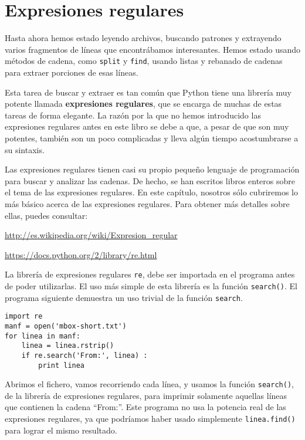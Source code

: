 
\chapter{Expresiones regulares}

Hasta ahora hemos estado leyendo archivos, buscando patrones y extrayendo varios
fragmentos de líneas que encontrábamos interesantes. Hemos estado usando métodos de cadena, como {\tt split}
y {\tt find}, usando listas y rebanado de cadenas para extraer porciones de esas líneas.

Esta tarea de buscar y extraer es tan común que Python tiene una librería muy potente
llamada {\bf expresiones regulares}, que se encarga de muchas de estas tareas de forma elegante. La
razón por la que no hemos introducido las expresiones regulares antes en este libro se debe a que,
a pesar de que son muy potentes, también son un poco complicadas y lleva algún tiempo acostumbrarse a su
sintaxis.

Las expresiones regulares tienen casi su propio pequeño lenguaje de programación para buscar y analizar
las cadenas. De hecho, se han escritos libros enteros sobre el tema de las expresiones regulares.
En este capítulo, nosotros sólo cubriremos lo más básico acerca de las expresiones regulares.
Para obtener más detalles sobre ellas, puedes consultar:

\url{http://es.wikipedia.org/wiki/Expresion_regular}

\url{https://docs.python.org/2/library/re.html}

La librería de expresiones regulares {\tt re}, debe ser importada en el programa antes de poder utilizarlas.
El uso más simple de esta librería es la función {\tt search()}. El programa siguiente
demuestra un uso trivial de la función {\tt search}.

\beforeverb
\begin{verbatim}
import re
manf = open('mbox-short.txt')
for linea in manf:
    linea = linea.rstrip()
    if re.search('From:', linea) :
        print linea
\end{verbatim}
\afterverb
%
Abrimos el fichero, vamos recorriendo cada línea, y usamos la función {\tt search()},
de la librería de expresiones regulares, para
imprimir solamente aquellas líneas que contienen la cadena ``From:''. Este programa no usa la potencia
real de las expresiones regulares, ya que podríamos haber usado simplemente {\tt linea.find()} para
lograr el mismo resultado.

